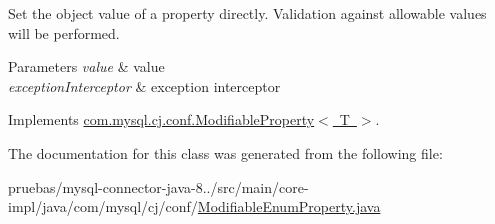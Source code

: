 Set the object value of a property directly. Validation against allowable values will be performed.


\begin{DoxyParams}{Parameters}
{\em value} & value \\
\hline
{\em exception\+Interceptor} & exception interceptor \\
\hline
\end{DoxyParams}


Implements \mbox{\hyperlink{interfacecom_1_1mysql_1_1cj_1_1conf_1_1_modifiable_property_a26fe9373efcddc22eb1fc1234eae81ed}{com.\+mysql.\+cj.\+conf.\+Modifiable\+Property$<$ T $>$}}.



The documentation for this class was generated from the following file\+:\begin{DoxyCompactItemize}
\item 
pruebas/mysql-\/connector-\/java-\/8../src/main/core-\/impl/java/com/mysql/cj/conf/\mbox{\hyperlink{_modifiable_enum_property_8java}{Modifiable\+Enum\+Property.\+java}}\end{DoxyCompactItemize}
